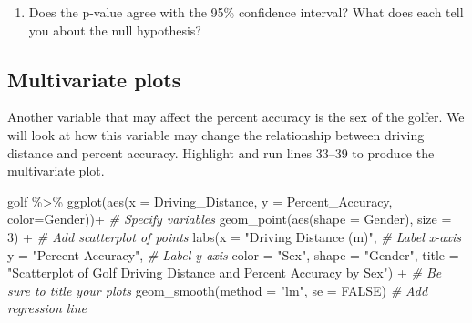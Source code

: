 \documentclass[
]{report}
\newenvironment{Shaded}{\begin{snugshade}}{\end{snugshade}}
\newcommand{\AttributeTok}[1]{\textcolor[rgb]{0.77,0.63,0.00}{#1}}
\newcommand{\CommentTok}[1]{\textcolor[rgb]{0.56,0.35,0.01}{\textit{#1}}}
\newcommand{\ConstantTok}[1]{\textcolor[rgb]{0.00,0.00,0.00}{#1}}
\newcommand{\DecValTok}[1]{\textcolor[rgb]{0.00,0.00,0.81}{#1}}
\newcommand{\FunctionTok}[1]{\textcolor[rgb]{0.00,0.00,0.00}{#1}}
\newcommand{\NormalTok}[1]{#1}
\newcommand{\SpecialCharTok}[1]{\textcolor[rgb]{0.00,0.00,0.00}{#1}}
\newcommand{\StringTok}[1]{\textcolor[rgb]{0.31,0.60,0.02}{#1}}
\providecommand{\tightlist}{%
  \setlength{\itemsep}{0pt}\setlength{\parskip}{0pt}}
\begin{document}
\vspace{.8in}

\begin{enumerate}
\def\labelenumi{\arabic{enumi}.}
\setcounter{enumi}{13}
\tightlist
\item
  Does the p-value agree with the 95\% confidence interval? What does each tell you about the null hypothesis?
\end{enumerate}

\vspace{.6in}

\hypertarget{multivariate-plots}{%
\subsection*{Multivariate plots}\label{multivariate-plots}}

Another variable that may affect the percent accuracy is the sex of the golfer. We will look at how this variable may change the relationship between driving distance and percent accuracy. Highlight and run lines 33--39 to produce the multivariate plot.

\begin{Shaded}
\begin{Highlighting}[]
\NormalTok{golf }\SpecialCharTok{\%\textgreater{}\%}
  \FunctionTok{ggplot}\NormalTok{(}\FunctionTok{aes}\NormalTok{(}\AttributeTok{x =}\NormalTok{ Driving\_Distance, }\AttributeTok{y =}\NormalTok{ Percent\_Accuracy, }\AttributeTok{color=}\NormalTok{Gender))}\SpecialCharTok{+}  \CommentTok{\# Specify variables}
  \FunctionTok{geom\_point}\NormalTok{(}\FunctionTok{aes}\NormalTok{(}\AttributeTok{shape =}\NormalTok{ Gender), }\AttributeTok{size =} \DecValTok{3}\NormalTok{) }\SpecialCharTok{+}  \CommentTok{\# Add scatterplot of points}
  \FunctionTok{labs}\NormalTok{(}\AttributeTok{x =} \StringTok{"Driving Distance (m)"}\NormalTok{,  }\CommentTok{\# Label x{-}axis}
       \AttributeTok{y =} \StringTok{"Percent Accuracy"}\NormalTok{,  }\CommentTok{\# Label y{-}axis}
       \AttributeTok{color =} \StringTok{"Sex"}\NormalTok{, }\AttributeTok{shape =} \StringTok{"Gender"}\NormalTok{,}
       \AttributeTok{title =} \StringTok{"Scatterplot of Golf Driving Distance and Percent Accuracy by Sex"}\NormalTok{) }\SpecialCharTok{+} \CommentTok{\# Be sure to title your plots}
  \FunctionTok{geom\_smooth}\NormalTok{(}\AttributeTok{method =} \StringTok{"lm"}\NormalTok{, }\AttributeTok{se =} \ConstantTok{FALSE}\NormalTok{)  }\CommentTok{\# Add regression line}
\end{Highlighting}
\end{Shaded}
\end{document}
